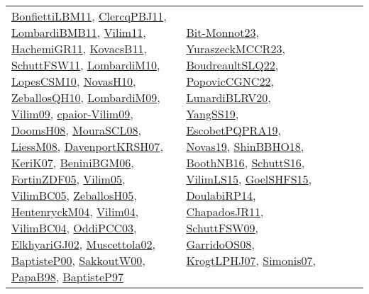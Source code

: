 {\begin{longtable}{llp{6cm}p{6cm}p{6cm}}
\href{papers/BonfiettiLBM11.pdf}{BonfiettiLBM11}\cite{BonfiettiLBM11}, \href{papers/ClercqPBJ11.pdf}{ClercqPBJ11}\cite{ClercqPBJ11}, \href{papers/LombardiBMB11.pdf}{LombardiBMB11}\cite{LombardiBMB11}, \href{papers/Vilim11.pdf}{Vilim11}\cite{Vilim11}, \href{articles/HachemiGR11.pdf}{HachemiGR11}\cite{HachemiGR11}, \href{articles/KovacsB11.pdf}{KovacsB11}\cite{KovacsB11}, \href{articles/SchuttFSW11.pdf}{SchuttFSW11}\cite{SchuttFSW11}, \href{papers/LombardiM10.pdf}{LombardiM10}\cite{LombardiM10}, \href{articles/LopesCSM10.pdf}{LopesCSM10}\cite{LopesCSM10}, \href{articles/NovasH10.pdf}{NovasH10}\cite{NovasH10}, \href{articles/ZeballosQH10.pdf}{ZeballosQH10}\cite{ZeballosQH10}, \href{papers/LombardiM09.pdf}{LombardiM09}\cite{LombardiM09}, \href{papers/Vilim09.pdf}{Vilim09}\cite{Vilim09}, \href{papers/cpaior-Vilim09.pdf}{cpaior-Vilim09}\cite{cpaior-Vilim09}, \href{papers/DoomsH08.pdf}{DoomsH08}\cite{DoomsH08}, \href{papers/MouraSCL08.pdf}{MouraSCL08}\cite{MouraSCL08}, \href{articles/LiessM08.pdf}{LiessM08}\cite{LiessM08}, \href{papers/DavenportKRSH07.pdf}{DavenportKRSH07}\cite{DavenportKRSH07}, \href{papers/KeriK07.pdf}{KeriK07}\cite{KeriK07}, \href{papers/BeniniBGM06.pdf}{BeniniBGM06}\cite{BeniniBGM06}, \href{papers/FortinZDF05.pdf}{FortinZDF05}\cite{FortinZDF05}, \href{papers/Vilim05.pdf}{Vilim05}\cite{Vilim05}, \href{articles/VilimBC05.pdf}{VilimBC05}\cite{VilimBC05}, \href{articles/ZeballosH05.pdf}{ZeballosH05}\cite{ZeballosH05}, \href{papers/HentenryckM04.pdf}{HentenryckM04}\cite{HentenryckM04}, \href{papers/Vilim04.pdf}{Vilim04}\cite{Vilim04}, \href{papers/VilimBC04.pdf}{VilimBC04}\cite{VilimBC04}, \href{papers/OddiPCC03.pdf}{OddiPCC03}\cite{OddiPCC03}, \href{papers/ElkhyariGJ02.pdf}{ElkhyariGJ02}\cite{ElkhyariGJ02}, \href{papers/Muscettola02.pdf}{Muscettola02}\cite{Muscettola02}, \href{articles/BaptisteP00.pdf}{BaptisteP00}\cite{BaptisteP00}, \href{articles/SakkoutW00.pdf}{SakkoutW00}\cite{SakkoutW00}, \href{articles/PapaB98.pdf}{PapaB98}\cite{PapaB98}, \href{papers/BaptisteP97.pdf}{BaptisteP97}\cite{BaptisteP97} & \href{papers/Bit-Monnot23.pdf}{Bit-Monnot23}\cite{Bit-Monnot23}, \href{articles/YuraszeckMCCR23.pdf}{YuraszeckMCCR23}\cite{YuraszeckMCCR23}, \href{papers/BoudreaultSLQ22.pdf}{BoudreaultSLQ22}\cite{BoudreaultSLQ22}, \href{papers/PopovicCGNC22.pdf}{PopovicCGNC22}\cite{PopovicCGNC22}, \href{articles/LunardiBLRV20.pdf}{LunardiBLRV20}\cite{LunardiBLRV20}, \href{papers/YangSS19.pdf}{YangSS19}\cite{YangSS19}, \href{articles/EscobetPQPRA19.pdf}{EscobetPQPRA19}\cite{EscobetPQPRA19}, \href{articles/Novas19.pdf}{Novas19}\cite{Novas19}, \href{articles/ShinBBHO18.pdf}{ShinBBHO18}\cite{ShinBBHO18}, \href{papers/BoothNB16.pdf}{BoothNB16}\cite{BoothNB16}, \href{papers/SchuttS16.pdf}{SchuttS16}\cite{SchuttS16}, \href{papers/VilimLS15.pdf}{VilimLS15}\cite{VilimLS15}, \href{articles/GoelSHFS15.pdf}{GoelSHFS15}\cite{GoelSHFS15}, \href{papers/DoulabiRP14.pdf}{DoulabiRP14}\cite{DoulabiRP14}, \href{papers/ChapadosJR11.pdf}{ChapadosJR11}\cite{ChapadosJR11}, \href{papers/SchuttFSW09.pdf}{SchuttFSW09}\cite{SchuttFSW09}, \href{articles/GarridoOS08.pdf}{GarridoOS08}\cite{GarridoOS08}, \href{papers/KrogtLPHJ07.pdf}{KrogtLPHJ07}\cite{KrogtLPHJ07}, \href{articles/Simonis07.pdf}{Simonis07}\cite{Simonis07}, 
\end{longtable}}
